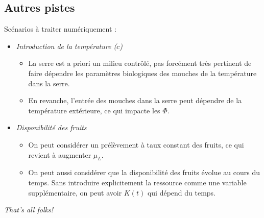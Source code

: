 \documentclass[11pt,twoside]{article}
\begin{document}
\subsection{Autres pistes}

Scénarios à traiter numériquement :

\begin{itemize}
\item \emph{Introduction de la température ($c$)}
  \begin{itemize}
  \item La serre est a priori un milieu contrôlé, pas forcément très pertinent de faire dépendre les paramètres biologiques des mouches de la température dans la serre. 
  \item En revanche, l'entrée des mouches dans la serre peut dépendre de la température extérieure, ce qui impacte les $\Phi$.
\end{itemize}

\item \emph{Disponibilité des fruits}
  \begin{itemize}
  \item On peut considérer un prélèvement à taux constant des fruits, ce qui revient à augmenter $\mu_L$. 
  \item On peut aussi considérer que la disponibilité des fruits évolue au cours du temps. Sans introduire explicitement la ressource comme une variable supplémentaire, on peut avoir $K(t)$ qui dépend du temps.
  \end{itemize}
\end{itemize}

\begin{center}
  \emph{That's all folks!}
\end{center}
\end{document}
